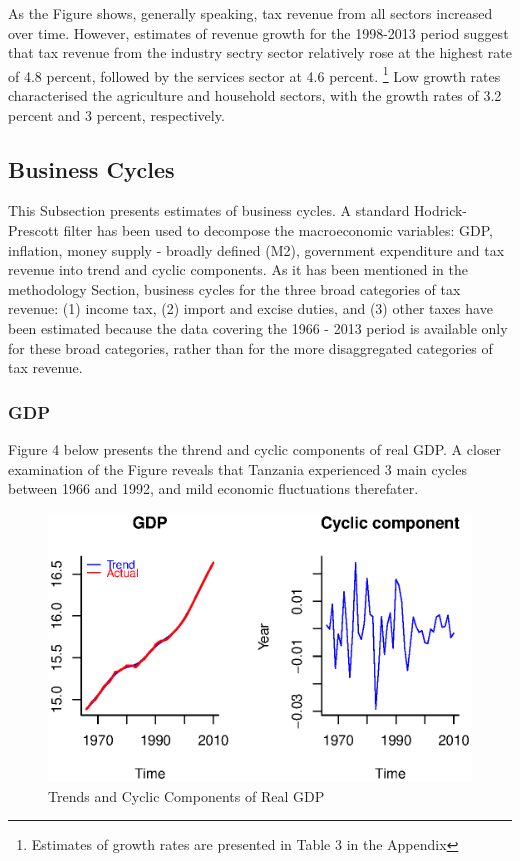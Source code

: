 \documentclass[12pt,a4paper,final]{article}
\begin{document}
As the Figure shows, generally speaking, tax revenue from all sectors increased over time.  However, estimates of revenue growth for the 1998-2013 period suggest that tax revenue from the industry sectry sector relatively rose at the highest rate of 4.8 percent, followed by the services sector at 4.6 percent. \footnote{Estimates of growth rates are presented in Table 3 in the Appendix}  Low growth rates characterised the agriculture and household sectors, with the growth rates of 3.2 percent and 3 percent, respectively.

\subsection{Business Cycles}

This Subsection presents estimates of business cycles. A standard Hodrick-Prescott filter has been used to decompose the macroeconomic variables: GDP, inflation,  money supply - broadly defined (M2), government expenditure and tax revenue into trend and cyclic components. As it has been mentioned in the methodology Section, business cycles for the three broad categories of tax revenue: (1) income tax, (2) import and excise duties, and (3) other taxes have been estimated because the data covering the 1966 - 2013 period is available only for these broad categories, rather than for the more disaggregated categories of tax revenue.

\subsubsection{GDP}

Figure 4 below presents the thrend and cyclic components of real GDP. A closer examination of the Figure reveals that Tanzania experienced 3 main cycles between 1966 and 1992, and mild economic fluctuations therefater. 

\begin{figure}[ht]
\centering
\begin{small}
\caption{Trends and Cyclic Components of Real GDP}
\end{small}
\includegraphics[scale=0.601]{gap_comp.eps} 
\end{figure}
\end{document}
